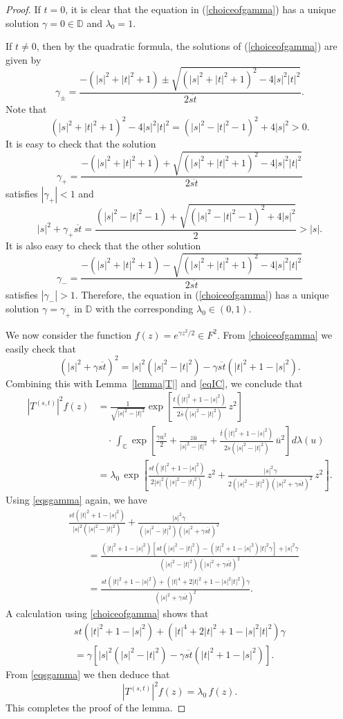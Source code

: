 \documentclass[reqno]{amsart}
\newcommand{\C}{{\mathbb C}}
\newcommand{\D}{{\mathbb D}}
\newcommand{\inc}{\int_{\C}}
\begin{document}
\begin{proof}
If $t=0$, it is clear that the equation in (\ref{choiceofgamma})
has a unique solution $\gamma=0\in\D$ and $\lambda_0=1$.

If $t\neq0$, then by the quadratic formula, the solutions of
(\ref{choiceofgamma}) are given by
$$\gamma_{\pm}=\frac{-(|s|^2+|t|^2+1)\pm
\sqrt{(|s|^2+|t|^2+1)^2-4|s|^2|t|^2}}{2\overline{st}}.$$
Note that
$$(|s|^2+|t|^2+1)^2-4|s|^2|t|^2=(|s|^2-|t|^2-1)^2+4|s|^2>0.$$
It is easy to check that the solution
$$\gamma_+=\frac{-(|s|^2+|t|^2+1)+\sqrt{(|s|^2+|t|^2+1)^2
-4|s|^2|t|^2}}{2\overline{st}}$$
satisfies
$|\gamma_+|<1$ and
$$|s|^2+\gamma_+\overline{st}=\frac{(|s|^2-|t|^2-1)+
\sqrt{(|s|^2-|t|^2-1)^2+4|s|^2}}{2}>|s|.$$
It is also easy to check that the other solution
$$\gamma_-=\frac{-(|s|^2+|t|^2+1)-\sqrt{(|s|^2+|t|^2+1)^2
-4|s|^2|t|^2}}{2\overline{st}}$$
satisfies $|\gamma_-|>1$. Therefore, the equation in
(\ref{choiceofgamma}) has a unique solution $\gamma=\gamma_+$
in $\D$ with the corresponding $\lambda_0\in(0,1)$.

We now consider the function $f(z)=e^{\gamma z^2/2}\in F^2$.
From \eqref{choiceofgamma} we easily check that
\begin{equation}\label{eqsgamma}
\left(|s|^2+\gamma{\overline{st}}\right)^2
={|s|^2(|s|^2-|t|^2)-\gamma{\overline{st}}(|t|^2+1-|s|^2)}.
\end{equation}
Combining this with Lemma~\ref{lemma|T|} and \eqref{eqIC},
we conclude that
\begin{align*}
\left|T^{(s,t)}\right|^2 f(z)
 &=\frac{1}{\sqrt{|s|^2-|t|^2}}\exp\left[\frac{t(|t|^2+1-|s|^2)}{2\overline{s}(|s|^2-|t|^2)}\,z^2\right]\\[8pt]
&\quad\cdot\,\inc\exp\left[\frac{\gamma u^2}{2}+\frac{z\overline{u}}{{|s|^2-|t|^2}}+
\frac{\bar t(|t|^2+1-|s|^2)}{2s(|s|^2-|t|^2)}\,\overline u^2\right] d\lambda(u)\\
&=\lambda_0\,\exp\left[\frac{st(|t|^2+1-|s|^2)}
{2|s|^2(|s|^2-|t|^2)}\,z^2+\frac{|s|^2 \gamma}{2(|s|^2-|t|^2)\left(|s|^2
+\gamma{\overline{st}}\right)^2}\,z^{2}\right].
\end{align*}
Using \eqref{eqsgamma} again, we have
\begin{align*}
&\frac{st(|t|^2+1-|s|^2)}{|s|^2(|s|^2-|t|^2)}+\frac{|s|^2\gamma}
{(|s|^2-|t|^2)\left(|s|^2+\gamma{\overline{st}}\right)^2}\\
&\qquad=\frac{(|t|^2+1-|s|^2)\left[st(|s|^2-|t|^2)-(|t|^2+1-|s|^2)|t|^2
\gamma\right]+|s|^2 \gamma}{(|s|^2-|t|^2)\left(|s|^2+
\gamma{\overline{st}}\right)^2}\\
&\qquad=\frac{st(|t|^2+1-|s|^2)+\left(|t|^4+2|t|^2+1-|s|^2|t|^2\right)\gamma}{\left(|s|^2+\gamma{\overline{st}}\right)^2}.
\end{align*}
A calculation using \eqref{choiceofgamma} shows that
\begin{multline*}
st(|t|^2+1-|s|^2)+(|t|^4+2|t|^2+1-|s|^2|t|^2)\gamma\\
=\gamma\left[|s|^2(|s|^2-|t|^2)-\gamma{\overline{st}}
(|t|^2+1-|s|^2)\right].
\end{multline*}
From \eqref{eqsgamma} we then deduce that
$$\left|T^{(s,t)}\right|^2 f(z)=\lambda_0\,f(z).$$
This completes the proof of the lemma.
\end{proof}
\end{document}
